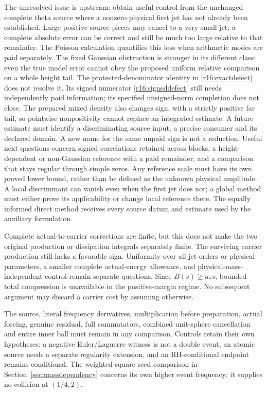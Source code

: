 \documentclass[11pt]{article}
\numberwithin{equation}{section}
\begin{document}
The unresolved issue is upstream: obtain useful control from the
unchanged complete theta source where a nonzero physical first jet has
not already been established. Large positive source pieces may cancel
to a very small jet; a complete absolute error can be correct and still
be much too large relative to that remainder. The Poisson calculation
quantifies this loss when arithmetic modes are paid separately. The
fixed Gaussian obstruction is stronger in its different class: even
the true model error cannot obey the proposed uniform relative
comparison on a whole height tail. The protected-denominator identity in
\eqref{r16:exactdefect} does not resolve it. Its signed numerator
\eqref{r16:signeddefect} still needs independently paid information;
its specified unsigned-norm completion does not close. The prepared
mixed density also changes sign, with a strictly positive far tail, so
pointwise nonpositivity cannot replace an integrated estimate.
A future estimate must identify a discriminating source input, a
precise consumer and its declared domain. A new name for the same unpaid sign is not a reduction.
Useful next questions concern signed correlations retained across
blocks, a height-dependent or non-Gaussian reference with a paid
remainder, and a comparison that stays regular through simple zeros.
Any reference scale must have its own proved lower bound, rather than
be defined as the unknown physical amplitude. A local discriminant
can vanish even when the first jet does not; a global method must
either prove its applicability or change local reference there.
The equally informed direct method receives every source datum and
estimate used by the auxiliary formulation.

Complete actual-to-carrier corrections are finite, but this does not
make the two original production or dissipation integrals separately
finite. The surviving carrier production still lacks a favorable sign.
Uniformity over all jet orders or physical parameters, a smaller
complete actual-energy allowance, and physical-mass-independent control
remain separate questions. Since $B(s)\ge a_*s$, bounded total
compression is unavailable in the positive-margin regime. No subsequent
argument may discard a carrier cost by assuming otherwise.

The source, literal frequency derivatives, multiplication before
preparation, actual forcing, genuine residual, full commutators,
combined unit-sphere cancellation and entire inner ball must remain in
any comparison. Controls retain their own hypotheses: a negative
Euler/Laguerre witness is not a double event, an atomic source needs a
separate regularity extension, and an RH-conditional endpoint remains
conditional. The weighted-square seed comparison in
Section~\ref{sec:massdependency} concerns its own higher event frequency;
it supplies no collision at $(1/4,2)$.
\end{document}
